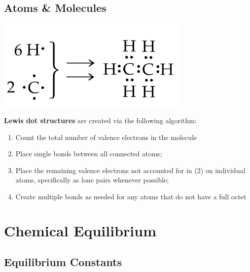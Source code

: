 \documentclass{tufte-book}
\renewcommand{\emph}[1]{\textbf{#1}}
\begin{document}
\section{Atoms \& Molecules}
\begin{marginfigure}[3cm]
\begin{center}
  \includegraphics[width=0.7\textwidth]{lewis} \phantom{mmmm}
\end{center}
\end{marginfigure}
\emph{Lewis dot structures} are created via the following algorithm: \begin{enumerate}
  \item Count the total number of valence electrons in the molecule
  \item Place single bonds between all connected atoms;
  \item Place the remaining valence electrons not accounted for in (2) on individual atoms, specifically as lone pairs whenever possible;
  \item Create multiple bonds as needed for any atoms that do not have a full octet
\end{enumerate}

\chapter{Chemical Equilibrium}

\section{Equilibrium Constants}
\end{document}
